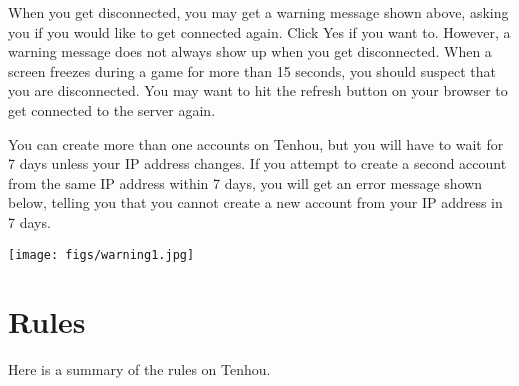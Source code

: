 \bigskip
When you get disconnected, you may get a warning message shown above, asking you if you would like to get connected again. Click Yes if you want to. However, a warning message does not always show up when you get disconnected. When a screen freezes during a game for more than 15 seconds, you should suspect that you are disconnected. You may want to hit the refresh button on your browser to get connected to the server again. 

\bigskip
You can create more than one accounts on {\jap Tenhou}, but you will have to wait for 7 days unless your IP address changes. If you attempt to create a second account from the same IP address within 7 days, you will get an error message shown below, telling you that you cannot create a new account from your IP address in 7 days. 

\begin{center}
\vspace{1mm}
\texttt{[image: figs/warning1.jpg]}
\end{center}

\section{Rules}

Here is a summary of the rules on {\jap Tenhou}. 

